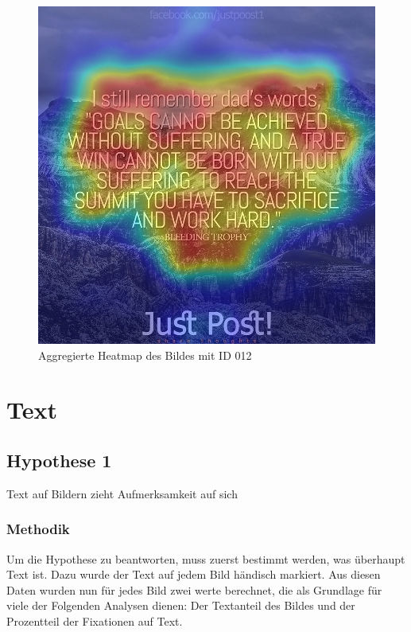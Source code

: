\documentclass[
    language=german, %
    thesis=seminar, %
    supervisor=postdoc, %
    multiauthor=true, %
    ]{settings/csssa-thesis}
\begin{document}
\begin{figure}[h]
	\centering
	\includegraphics[width=\linewidth,height=0.8\textheight,keepaspectratio]{figures/id012_overlay.jpg}
	\caption{Aggregierte Heatmap des Bildes mit ID 012}\label{fig:bildid012}
\end{figure}



\section{Text}

\subsection{Hypothese 1}
Text auf Bildern zieht Aufmerksamkeit auf sich

\subsubsection{Methodik}
Um die Hypothese zu beantworten, muss zuerst bestimmt werden, was überhaupt Text ist. 
Dazu wurde der Text auf jedem Bild händisch markiert. Aus diesen Daten wurden nun für 
jedes Bild zwei werte berechnet, die als Grundlage für viele der Folgenden Analysen dienen: 
Der Textanteil des Bildes und der Prozentteil der Fixationen auf Text. 
\end{document}
